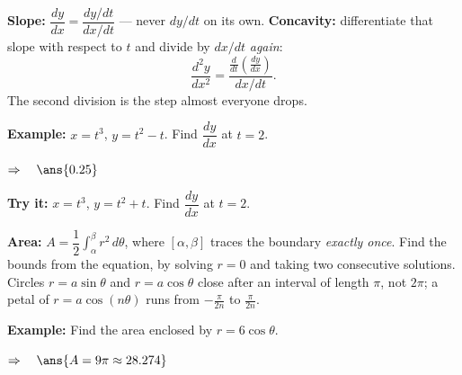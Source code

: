 \documentclass[12pt]{article}
\begin{document}


\begin{formulabox}
\textbf{Slope:} $\dfrac{dy}{dx} = \dfrac{dy/dt}{dx/dt}$ --- never $dy/dt$ on its own. \textbf{Concavity:} differentiate that slope with respect to $t$ and divide by $dx/dt$ \emph{again}:
\[ \frac{d^2y}{dx^2} = \frac{\frac{d}{dt}\!\left(\frac{dy}{dx}\right)}{dx/dt}. \]
The second division is the step almost everyone drops.
\end{formulabox}

\begin{examplebox}
\textbf{Example:} \quad $x = t^3$, $y = t^2 - t$. Find $\dfrac{dy}{dx}$ at $t = 2$.

$\Rightarrow\quad \ans{0.25}$
\end{examplebox}

\begin{tryitbox}
\textbf{Try it:} \quad $x = t^3$, $y = t^2 + t$. Find $\dfrac{dy}{dx}$ at $t = 2$.\\[2pt]
\end{tryitbox}


\begin{formulabox}
\textbf{Area:} $A = \dfrac{1}{2}\displaystyle\int_{\alpha}^{\beta} r^2\,d\theta$, where $[\alpha, \beta]$ traces the boundary \emph{exactly once}. Find the bounds from the equation, by solving $r = 0$ and taking two consecutive solutions. Circles $r = a\sin\theta$ and $r = a\cos\theta$ close after an interval of length $\pi$, not $2\pi$; a petal of $r = a\cos(n\theta)$ runs from $-\frac{\pi}{2n}$ to $\frac{\pi}{2n}$.
\end{formulabox}

\begin{examplebox}
\textbf{Example:} \quad Find the area enclosed by $r = 6\cos\theta$.

$\Rightarrow\quad \ans{A = 9\pi \approx 28.274}$
\end{examplebox}
\end{document}
